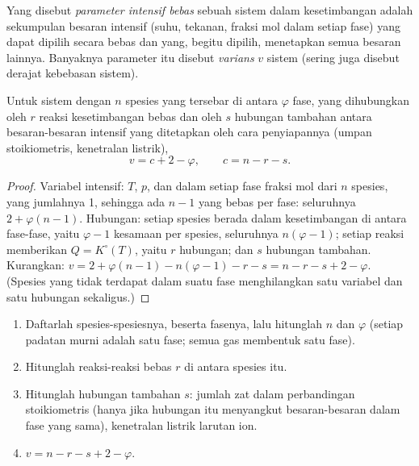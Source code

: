 \begin{definition}[Varians]\label{def:b2:equilibrium-shifts:variance}
Yang disebut \emph{parameter intensif bebas}
sebuah sistem dalam kesetimbangan adalah sekumpulan besaran intensif
(suhu, tekanan, fraksi mol dalam setiap fase) yang dapat dipilih secara
bebas dan yang, begitu dipilih, menetapkan semua besaran lainnya.
Banyaknya parameter itu disebut \emph{varians} $v$ sistem
(sering juga disebut derajat kebebasan sistem).
\end{definition}

\begin{theorem}\label{thm:b2:equilibrium-shifts:phase-rule}
Untuk sistem dengan $n$ spesies yang tersebar di antara $\varphi$ fase,
yang dihubungkan oleh $r$ reaksi kesetimbangan bebas dan oleh $s$
hubungan tambahan antara besaran-besaran intensif yang ditetapkan oleh
cara penyiapannya (umpan stoikiometris, kenetralan listrik),
\[
  v = c + 2 - \varphi, \qquad c = n - r - s .
\]
\end{theorem}

\begin{proof}
Variabel intensif: $T$, $p$, dan dalam setiap fase fraksi mol dari $n$
spesies, yang jumlahnya 1, sehingga ada $n - 1$ yang bebas per fase: seluruhnya
$2 +
\varphi(n - 1)$. Hubungan: setiap spesies berada dalam kesetimbangan
di antara fase-fase, yaitu $\varphi - 1$ kesamaan  per
spesies, seluruhnya $n(\varphi -
1)$; setiap reaksi memberikan
$Q = K^\circ(T)$, yaitu $r$ hubungan; dan $s$ hubungan tambahan.
Kurangkan: $v = 2 + \varphi(n - 1) - n(\varphi - 1) - r -
s = n - r - s + 2 - \varphi$.
(Spesies yang tidak terdapat dalam suatu fase menghilangkan satu variabel
dan satu hubungan sekaligus.)
\end{proof}

\begin{method}\label{met:b2:equilibrium-shifts:variance}
\begin{enumerate}
  \item Daftarlah spesies-spesiesnya, beserta fasenya, lalu hitunglah $n$
        dan $\varphi$ (setiap padatan murni adalah satu fase; semua gas
        membentuk satu fase).
  \item Hitunglah reaksi-reaksi bebas $r$ di antara spesies itu.
  \item Hitunglah hubungan tambahan $s$: jumlah zat dalam perbandingan
        stoikiometris (hanya jika hubungan itu menyangkut besaran-besaran
        dalam fase yang sama), kenetralan listrik larutan ion.
  \item $v = n - r - s + 2 - \varphi$.
\end{enumerate}
\end{method}


